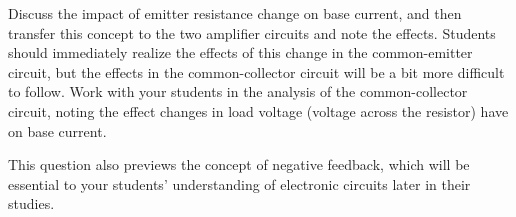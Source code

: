 
Discuss the impact of emitter resistance change on base current, and then transfer this concept to the two amplifier circuits and note the effects.  Students should immediately realize the effects of this change in the common-emitter circuit, but the effects in the common-collector circuit will be a bit more difficult to follow.  Work with your students in the analysis of the common-collector circuit, noting the effect changes in load voltage (voltage across the resistor) have on base current.

This question also previews the concept of negative feedback, which will be essential to your students' understanding of electronic circuits later in their studies.




